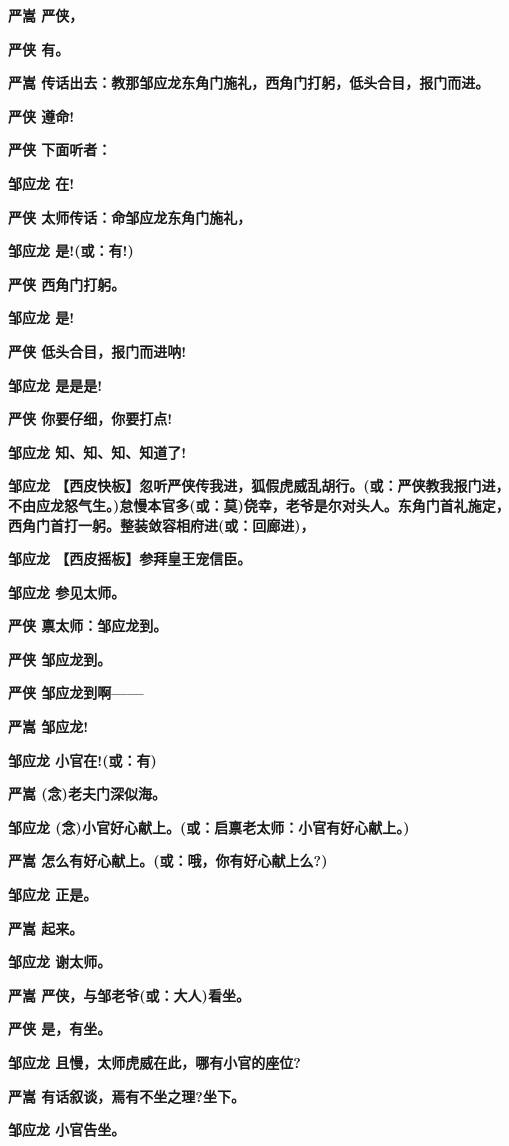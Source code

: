 \textbf{严嵩 严侠，}

\textbf{严侠 有。}

\textbf{严嵩
传话出去：教那邹应龙东角门施礼，西角门打躬，低头合目，报门而进。}

\textbf{严侠 遵命!}

\textbf{严侠 下面听者：}

\textbf{邹应龙 在!}

\textbf{严侠 太师传话：命邹应龙东角门施礼，}

\textbf{邹应龙 是!(或：有!)}

\textbf{严侠 西角门打躬。}

\textbf{邹应龙 是!}

\textbf{严侠 低头合目，报门而进呐!}

\textbf{邹应龙 是是是!}

\textbf{严侠 你要仔细，你要打点!}

\textbf{邹应龙 知、知、知、知道了!}

\textbf{邹应龙
【西皮快板】忽听严侠传我进，狐假虎威乱胡行。(或：严侠教我报门进，不由应龙怒气生。)怠慢本官多(或：莫)侥幸，老爷是尔对头人。东角门首礼施定，西角门首打一躬。整装敛容相府进(或：回廊进)，}

\textbf{邹应龙 【西皮摇板】参拜皇王宠信臣。}

\textbf{邹应龙 参见太师。}

\textbf{严侠 禀太师：邹应龙到。}

\textbf{严侠 邹应龙到。}

\textbf{严侠 邹应龙到啊------}

\textbf{严嵩 邹应龙!}

\textbf{邹应龙 小官在!(或：有)}

\textbf{严嵩 (念)老夫门深似海。}

\textbf{邹应龙 (念)小官好心献上。(或：启禀老太师：小官有好心献上。)}

\textbf{严嵩 怎么有好心献上。(或：哦，你有好心献上么?)}

\textbf{邹应龙 正是。}

\textbf{严嵩 起来。}

\textbf{邹应龙 谢太师。}

\textbf{严嵩 严侠，与邹老爷(或：大人)看坐。}

\textbf{严侠 是，有坐。}

\textbf{邹应龙 且慢，太师虎威在此，哪有小官的座位?}

\textbf{严嵩 有话叙谈，焉有不坐之理?坐下。}

\textbf{邹应龙 小官告坐。}

